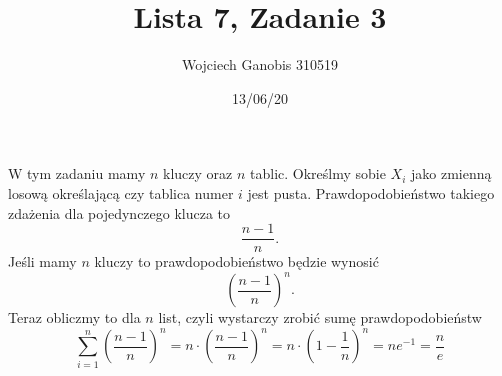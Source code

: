 \documentclass{article}
\title{Lista 7, Zadanie 3}
\author{Wojciech Ganobis 310519}
\date{13/06/20}
\begin{document}
\maketitle
W tym zadaniu mamy $n$ kluczy oraz $n$ tablic. Określmy sobie $X_i$ jako zmienną losową określającą czy tablica numer $i$ jest pusta. Prawdopodobieństwo takiego zdażenia dla pojedynczego klucza to $$\frac{n-1}{n}.$$ Jeśli mamy $n$ kluczy to prawdopodobieństwo będzie wynosić $$(\frac{n-1}{n})^{n}.$$ Teraz obliczmy to dla $n$ list, czyli wystarczy zrobić sumę prawdopodobieństw
$$\sum_{i=1}^{n}(\frac{n-1}{n})^{n} = n \cdot (\frac{n-1}{n})^{n} = n \cdot (1-\frac{1}{n})^{n} = ne^{-1} = \frac{n}{e}$$
\end{document}
